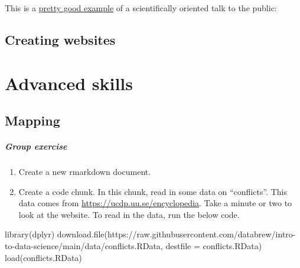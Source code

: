 \documentclass[
]{book}
\newenvironment{Shaded}{\begin{snugshade}}{\end{snugshade}}
\newcommand{\AttributeTok}[1]{\textcolor[rgb]{0.77,0.63,0.00}{#1}}
\newcommand{\FunctionTok}[1]{\textcolor[rgb]{0.00,0.00,0.00}{#1}}
\newcommand{\NormalTok}[1]{#1}
\newcommand{\StringTok}[1]{\textcolor[rgb]{0.31,0.60,0.02}{#1}}
\begin{document}
This is a \href{https://www.youtube.com/watch?v=mae2eugjUsU}{pretty good example} of a scientifically oriented talk to the public:

\hypertarget{creating-websites}{%
\chapter*{Creating websites}\label{creating-websites}}

\hypertarget{part-advanced-skills}{%
\part{Advanced skills}\label{part-advanced-skills}}

\hypertarget{mapping}{%
\chapter{Mapping}\label{mapping}}

\hypertarget{group-exercise}{%
\subsubsection*{Group exercise}\label{group-exercise}}

\begin{enumerate}
\def\labelenumi{\arabic{enumi}.}
\item
  Create a new rmarkdown document.
\item
  Create a code chunk. In this chunk, read in some data on ``conflicts''. This data comes from \url{https://ucdp.uu.se/encyclopedia}. Take a minute or two to look at the website. To read in the data, run the below code.
\end{enumerate}

\begin{Shaded}
\begin{Highlighting}[]
\FunctionTok{library}\NormalTok{(dplyr)}
\FunctionTok{download.file}\NormalTok{(}\StringTok{\textquotesingle{}https://raw.githubusercontent.com/databrew/intro{-}to{-}data{-}science/main/data/conflicts.RData\textquotesingle{}}\NormalTok{,}
              \AttributeTok{destfile =} \StringTok{\textquotesingle{}conflicts.RData\textquotesingle{}}\NormalTok{)}
\FunctionTok{load}\NormalTok{(}\StringTok{\textquotesingle{}conflicts.RData\textquotesingle{}}\NormalTok{)}
\end{Highlighting}
\end{Shaded}
\end{document}
